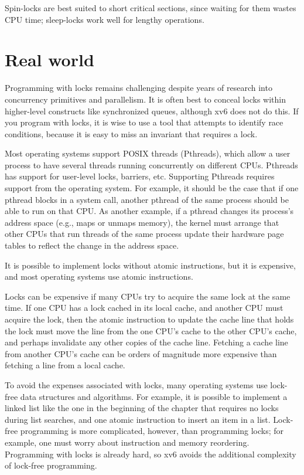 Spin-locks are best suited to short critical sections,
since waiting for them wastes CPU time;
sleep-locks work well for lengthy operations.

\section{Real world}
Programming with locks remains challenging despite years of research
into concurrency primitives and parallelism.
It is often best to conceal locks within 
higher-level constructs like synchronized queues, although xv6 does not
do this.  If you program with locks, it is wise to use a tool that attempts to
identify race conditions, because it is easy to miss an invariant that requires
a lock.

Most operating systems support POSIX threads (Pthreads), which allow a user
process to have several threads running concurrently on different CPUs.
Pthreads has support for user-level locks, barriers, etc.  Supporting Pthreads requires
support from the operating system. For example, it should be the case that if
one pthread blocks in a system call, another pthread of the same process should
be able to run on that CPU.  As another example, if a pthread changes its
process's address space (e.g., maps or unmaps memory), the kernel must arrange that
other CPUs that run threads of the same process update their hardware page
tables to reflect the change in the address space. 

It is possible to implement locks without atomic instructions, but it is
expensive, and most operating systems use atomic instructions.

Locks can be expensive if many CPUs try to acquire the same lock
at the same time.  If one CPU has a lock
cached in its local cache, and another CPU must acquire the lock, then the
atomic instruction to update the cache line that holds the lock must move the line
from the one CPU's cache to the other CPU's cache, and perhaps
invalidate any other copies of the cache line.  Fetching a cache line from
another CPU's cache can be orders of magnitude more expensive than
fetching a line from a local cache.

To avoid the expenses associated with locks, many operating systems use
lock-free data structures and algorithms.  For example, it is possible to
implement a linked list like the one in the beginning of the chapter that
requires no locks during list searches, and one atomic instruction to insert an
item in a list.  Lock-free programming is more complicated, however, than
programming locks; for example, one must worry about instruction and memory
reordering.  Programming with locks is already hard, so xv6 avoids the
additional complexity of lock-free programming.

